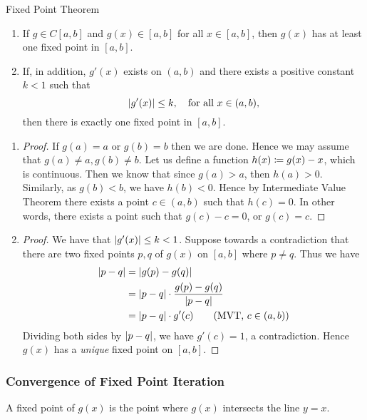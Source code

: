 \documentclass[class=article, crop=false]{standalone}
\begin{document}
  \begin{theorem}{Fixed Point Theorem}
    \begin{enumerate}[label=(\arabic*)]
      \item If $g\in C[a, b]$ and $g(x)\in [a, b]$ for all $x\in [a, b]$, then $g(x)$ has at least one fixed point in $[a, b]$.
      \item If, in addition, $g'(x)$ exists on $(a, b)$ and there exists a positive constant $k < 1$ such that
      \[
        \left\lvert g'(x) \right\rvert\leq k, \quad \text{for all }x\in (a, b),
      \]
      then there is exactly one fixed point in $[a, b]$.
    \end{enumerate}
    \begin{enumerate}[label=(\arabic*)]
      \item
      \begin{proof}
        If $g(a) = a$ or $g(b) = b$ then we are done. Hence we may assume that $g(a)\neq a, g(b)\neq b$. Let us define a function $h(x)\coloneqq g(x) - x$, which is continuous. Then we know that since $g(a) > a$, then $h(a) > 0$. Similarly, as $g(b) < b$, we have $h(b) < 0$. Hence by Intermediate Value Theorem there exists a point $c\in (a, b)$ such that $h(c) = 0$. In other words, there exists a point such that $g(c) - c = 0$, or $g(c) = c$.
      \end{proof}
      \item
      \begin{proof}
        We have that $\left\lvert g'(x) \right\rvert\leq k < 1$. Suppose towards a contradiction that there are two fixed points $p, q$ of $g(x)$ on $[a, b]$ where $p\neq q$. Thus we have
        \begin{align*}
          \left\lvert p - q \right\rvert &= \left\lvert g(p) - g(q) \right\rvert \\
                      &= \left\lvert p - q \right\rvert\cdot \frac{g(p) - g(q)}{\left\lvert p - q \right\rvert} \\
                      &= \left\lvert p - q \right\rvert\cdot g'(c) \tag{MVT, $c\in (a, b)$}
        \end{align*}
        Dividing both sides by $\left\lvert p - q \right\rvert$, we have $g'(c) = 1$, a contradiction. Hence $g(x)$ has a \emph{unique} fixed point on $[a, b]$.
      \end{proof}
    \end{enumerate}
  \end{theorem}
  \subsubsection{Convergence of Fixed Point Iteration}
  A fixed point of $g(x)$ is the point where $g(x)$ intersects the line $y = x$.
\end{document}
